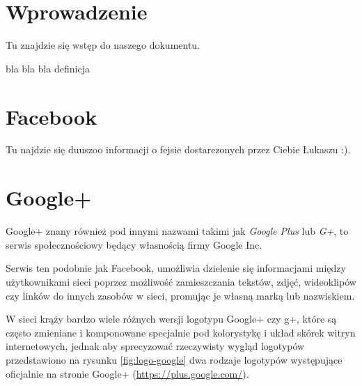 
\section{Wprowadzenie}
\label{sec:wprowadzenie}

Tu znajdzie się wstęp do naszego dokumentu.

\begin{defn}
bla bla bla definicja
\end{defn}


\clearpage

\section{Facebook}
\label{sec:facebook}
Tu najdzie się duuszoo informacji o fejsie dostarczonych przez Ciebie Łukaszu :).


\clearpage

\section{Google+}
\label{sec:google-plus}
Google+ znany również pod innymi nazwami takimi jak \emph{Google Plus} lub \emph{G+}, to serwis społecznościowy będący własnością firmy Google Inc.

Serwis ten podobnie jak Facebook, umożliwia dzielenie się informacjami między użytkownikami sieci poprzez możliwość zamieszczania tekstów, zdjęć, wideoklipów czy linków do innych zasobów w sieci, promując je własną marką lub nazwiskiem.

W sieci krąży bardzo wiele różnych wersji logotypu Google+ czy g+, które są często zmieniane i komponowane specjalnie pod kolorystykę i układ skórek witryn internetowych, jednak aby sprecyzować rzeczywisty wygląd logotypów przedstawiono na rysunku \ref{fig:logo-google} dwa rodzaje logotypów występujące oficjalnie na stronie Google+ (\url{https://plus.google.com/}).

